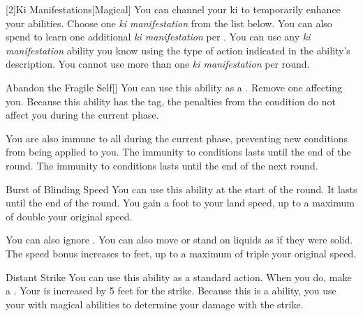         [2]{Ki Manifestations}[Magical]
        You can channel your ki to temporarily enhance your abilities.
        Choose one \textit{ki manifestation} from the list below.
        You can also spend  to learn one additional \textit{ki manifestation} per .
        You can use any \textit{ki manifestation} ability you know using the type of action indicated in the ability's description.
        You cannot use more than one \textit{ki manifestation} per round.
        {
            \begin{apability}{Abandon the Fragile Self}[]
                You can use this ability as a .
                Remove one  affecting you.
                Because this ability has the  tag, the penalties from the condition do not affect you during the current phase.

                \rankline
                 You are also immune to all  during the current phase, preventing new conditions from being applied to you.
                 The immunity to conditions lasts until the end of the round.
                 The immunity to conditions lasts until the end of the next round.
            \end{apability}

            \begin{apability}{Burst of Blinding Speed}
                You can use this ability at the start of the round.
                It lasts until the end of the round.
                You gain a  foot  to your land speed, up to a maximum of double your original speed.

                \rankline
                 You can also ignore .
                 You can also move or stand on liquids as if they were solid.
                 The speed bonus increases to  feet, up to a maximum of triple your original speed.
            \end{apability}

            \begin{apability}{Distant Strike}
                You can use this ability as a standard action.
                When you do, make a .
                Your  is increased by 5 feet for the strike.
                Because this is a  ability, you use your  with magical abilities to determine your damage with the strike.


\end{apability}}
